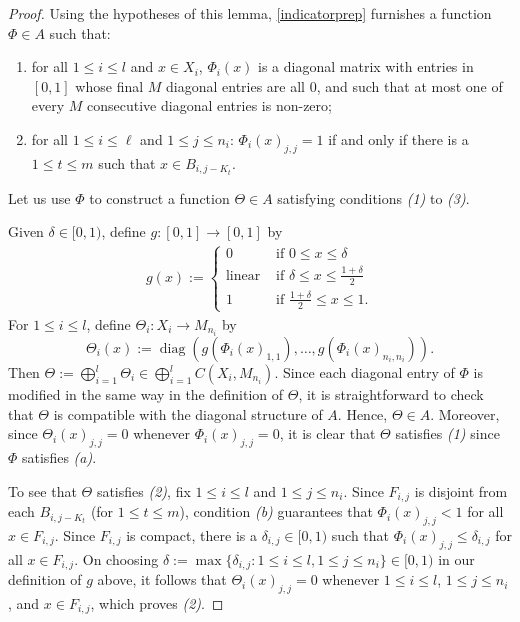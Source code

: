 \documentclass[12pt]{amsart}
\numberwithin{equation}{section}
\theoremstyle{definition}
\theoremstyle{remark}
\newcommand{\diag}{\operatorname{diag}}
\begin{document}
\begin{proof}	
	Using the hypotheses of this lemma, \autoref{indicatorprep} furnishes a function $\Phi\in A$ such that: \begin{enumerate}[font=\itshape, label=(\alph*)]
		\item for all $1\leq i\leq  l $ and $x\in X_{i}$, $\Phi_{i}(x)$ is a diagonal matrix with entries in $[0,1]$ whose final $M$ diagonal entries are all $0$, and such that at most one of every $M$ consecutive diagonal entries is non-zero;
		\item for all $1\leq i\leq \ell$ and $1\leq j\leq n_{i}$: $\Phi_{i}(x)_{j,j}=1$ if and only if there is a $1\leq t\leq m$ such that $x\in B_{i,j-K_{t}}$. 
	\end{enumerate}
	Let us use $\Phi$ to construct a function $\Theta\in A$ satisfying conditions \textit{(1)} to \textit{(3)}. 
	
	Given $\delta\in [0,1)$, define $g\colon[0,1]\to[0,1]$ by
	$$
	\begin{aligned}
	g(x):=
	\begin{cases}
	0& \text{ if }  0\leq x\leq\delta\\
	\text{linear} &\text{ if }  \delta\leq x\leq\frac{1+\delta}{2}\\
	1&\text{ if } \frac{1+\delta}{2}\leq x\leq 1.	
	\end{cases}
	\end{aligned}
	$$
	For $1\leq i\leq  l $, define $\Theta_{i}\colon X_{i}\to M_{n_{i}}$ by 
	$$
	\Theta_{i}(x):=\diag(g(\Phi_{i}(x)_{1,1}),\ldots,g(\Phi_{i}(x)_{n_{i},n_{i}})).
	$$
	Then $\Theta:=\bigoplus_{i=1}^{ l }\Theta_{i}\in\bigoplus_{i=1}^{ l }C(X_{i},M_{n_{i}})$. Since each diagonal entry of $\Phi$ is modified in the same way in the definition of $\Theta$, it is straightforward to check that $\Theta$ is compatible with the diagonal structure of $A$. Hence, $\Theta\in A$. Moreover, since $\Theta_{i}(x)_{j,j}=0$ whenever $\Phi_{i}(x)_{j,j}=0$, it is clear that $\Theta$ satisfies \textit{(1)} since $\Phi$ satisfies \textit{(a)}.
		
	To see that $\Theta$ satisfies \textit{(2)}, fix $1\leq i\leq  l $ and $1\leq j\leq n_{i}$. Since $F_{i,j}$ is disjoint from each $B_{i,j-K_{t}}$ (for $1\leq t\leq m$), condition \textit{(b)} guarantees that $\Phi_{i}(x)_{j,j}<1$ for all $x\in F_{i,j}$. Since $F_{i,j}$ is compact, there is a $\delta_{i,j}\in [0,1)$ such that $\Phi_{i}(x)_{j,j}\leq \delta_{i,j}$ for all $x\in F_{i,j}$. On choosing $\delta:=\max\{\delta_{i,j}:1\leq i\leq  l ,1\leq j\leq n_{i}\}\in [0,1)$ in our definition of $g$ above, it follows that $\Theta_{i}(x)_{j,j}=0$ whenever $1\leq i\leq  l $, $1\leq j\leq n_{i}$, and $x\in F_{i,j}$, which proves \textit{(2)}.
		

\end{proof}
\end{document}
